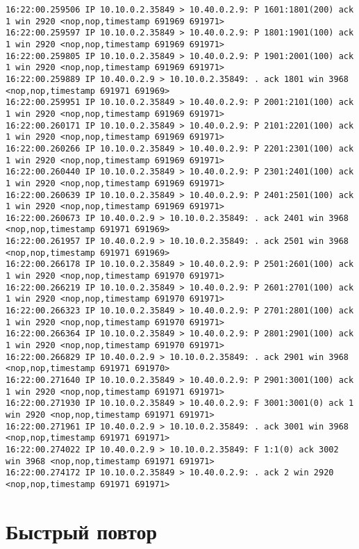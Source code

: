 \documentclass[a4paper,12pt]{article}
\begin{document}
\begin{Verbatim}
16:22:00.259506 IP 10.10.0.2.35849 > 10.40.0.2.9: P 1601:1801(200) ack 1 win 2920 <nop,nop,timestamp 691969 691971>
16:22:00.259597 IP 10.10.0.2.35849 > 10.40.0.2.9: P 1801:1901(100) ack 1 win 2920 <nop,nop,timestamp 691969 691971>
16:22:00.259805 IP 10.10.0.2.35849 > 10.40.0.2.9: P 1901:2001(100) ack 1 win 2920 <nop,nop,timestamp 691969 691971>
16:22:00.259889 IP 10.40.0.2.9 > 10.10.0.2.35849: . ack 1801 win 3968 <nop,nop,timestamp 691971 691969>
16:22:00.259951 IP 10.10.0.2.35849 > 10.40.0.2.9: P 2001:2101(100) ack 1 win 2920 <nop,nop,timestamp 691969 691971>
16:22:00.260171 IP 10.10.0.2.35849 > 10.40.0.2.9: P 2101:2201(100) ack 1 win 2920 <nop,nop,timestamp 691969 691971>
16:22:00.260266 IP 10.10.0.2.35849 > 10.40.0.2.9: P 2201:2301(100) ack 1 win 2920 <nop,nop,timestamp 691969 691971>
16:22:00.260440 IP 10.10.0.2.35849 > 10.40.0.2.9: P 2301:2401(100) ack 1 win 2920 <nop,nop,timestamp 691969 691971>
16:22:00.260639 IP 10.10.0.2.35849 > 10.40.0.2.9: P 2401:2501(100) ack 1 win 2920 <nop,nop,timestamp 691969 691971>
16:22:00.260673 IP 10.40.0.2.9 > 10.10.0.2.35849: . ack 2401 win 3968 <nop,nop,timestamp 691971 691969>
16:22:00.261957 IP 10.40.0.2.9 > 10.10.0.2.35849: . ack 2501 win 3968 <nop,nop,timestamp 691971 691969>
16:22:00.266178 IP 10.10.0.2.35849 > 10.40.0.2.9: P 2501:2601(100) ack 1 win 2920 <nop,nop,timestamp 691970 691971>
16:22:00.266219 IP 10.10.0.2.35849 > 10.40.0.2.9: P 2601:2701(100) ack 1 win 2920 <nop,nop,timestamp 691970 691971>
16:22:00.266323 IP 10.10.0.2.35849 > 10.40.0.2.9: P 2701:2801(100) ack 1 win 2920 <nop,nop,timestamp 691970 691971>
16:22:00.266364 IP 10.10.0.2.35849 > 10.40.0.2.9: P 2801:2901(100) ack 1 win 2920 <nop,nop,timestamp 691970 691971>
16:22:00.266829 IP 10.40.0.2.9 > 10.10.0.2.35849: . ack 2901 win 3968 <nop,nop,timestamp 691971 691970>
16:22:00.271640 IP 10.10.0.2.35849 > 10.40.0.2.9: P 2901:3001(100) ack 1 win 2920 <nop,nop,timestamp 691971 691971>
16:22:00.271930 IP 10.10.0.2.35849 > 10.40.0.2.9: F 3001:3001(0) ack 1 win 2920 <nop,nop,timestamp 691971 691971>
16:22:00.271961 IP 10.40.0.2.9 > 10.10.0.2.35849: . ack 3001 win 3968 <nop,nop,timestamp 691971 691971>
16:22:00.274022 IP 10.40.0.2.9 > 10.10.0.2.35849: F 1:1(0) ack 3002 win 3968 <nop,nop,timestamp 691971 691971>
16:22:00.274172 IP 10.10.0.2.35849 > 10.40.0.2.9: . ack 2 win 2920 <nop,nop,timestamp 691971 691971>
\end{Verbatim}

\section{Быстрый повтор}
\end{document}
